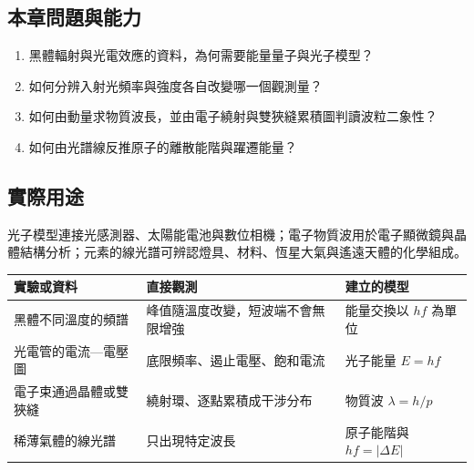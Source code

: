 \documentclass[11pt,a4paper]{article}
\newcounter{none}
\providecommand{\tightlist}{%
  \setlength{\itemsep}{0pt}\setlength{\parskip}{0pt}}
\begin{document}
\begin{HandoutLearningMap}

\subsection{本章問題與能力}\label{ux672cux7ae0ux554fux984cux8207ux80fdux529b}

\begin{enumerate}
\def\labelenumi{\arabic{enumi}.}
\tightlist
\item
  黑體輻射與光電效應的資料，為何需要能量量子與光子模型？
\item
  如何分辨入射光頻率與強度各自改變哪一個觀測量？
\item
  如何由動量求物質波長，並由電子繞射與雙狹縫累積圖判讀波粒二象性？
\item
  如何由光譜線反推原子的離散能階與躍遷能量？
\end{enumerate}

\subsection{實際用途}\label{ux5be6ux969bux7528ux9014}

光子模型連接光感測器、太陽能電池與數位相機；電子物質波用於電子顯微鏡與晶體結構分析；元素的線光譜可辨認燈具、材料、恆星大氣與遙遠天體的化學組成。

\end{HandoutLearningMap}

{\def\LTcaptype{none} %
\begin{longtable}[]{@{}
  >{\raggedright\arraybackslash}p{}
  >{\raggedright\arraybackslash}p{}
  >{\raggedright\arraybackslash}p{}@{}}
\toprule\noalign{}
\begin{minipage}[b]{\linewidth}\raggedright
實驗或資料
\end{minipage} & \begin{minipage}[b]{\linewidth}\raggedright
直接觀測
\end{minipage} & \begin{minipage}[b]{\linewidth}\raggedright
建立的模型
\end{minipage} \\
\midrule\noalign{}
\endhead
\bottomrule\noalign{}
\endlastfoot
黑體不同溫度的頻譜 & 峰值隨溫度改變，短波端不會無限增強 & 能量交換以 \(hf\) 為單位 \\
光電管的電流---電壓圖 & 底限頻率、遏止電壓、飽和電流 & 光子能量 \(E=hf\) \\
電子束通過晶體或雙狹縫 & 繞射環、逐點累積成干涉分布 & 物質波 \(\lambda=h/p\) \\
稀薄氣體的線光譜 & 只出現特定波長 & 原子能階與 \(hf=\lvert\Delta E\rvert\) \\
\end{longtable}
}
\end{document}
